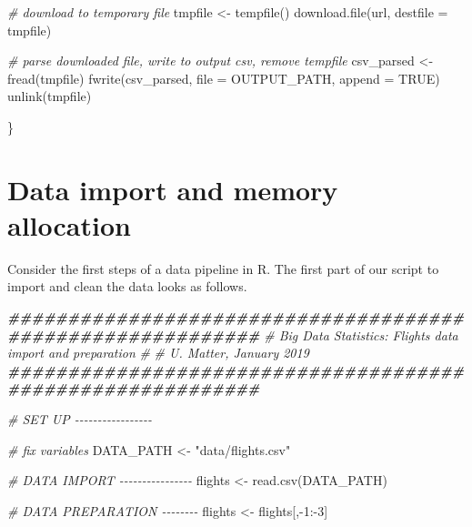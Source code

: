 \documentclass[
  12pt,
]{style/krantz}
\newenvironment{Shaded}{\begin{snugshade}}{\end{snugshade}}
\newcommand{\AttributeTok}[1]{\textcolor[rgb]{0.77,0.63,0.00}{#1}}
\newcommand{\CommentTok}[1]{\textcolor[rgb]{0.56,0.35,0.01}{\textit{#1}}}
\newcommand{\ConstantTok}[1]{\textcolor[rgb]{0.00,0.00,0.00}{#1}}
\newcommand{\DecValTok}[1]{\textcolor[rgb]{0.00,0.00,0.81}{#1}}
\newcommand{\DocumentationTok}[1]{\textcolor[rgb]{0.56,0.35,0.01}{\textbf{\textit{#1}}}}
\newcommand{\FunctionTok}[1]{\textcolor[rgb]{0.00,0.00,0.00}{#1}}
\newcommand{\NormalTok}[1]{#1}
\newcommand{\OtherTok}[1]{\textcolor[rgb]{0.56,0.35,0.01}{#1}}
\newcommand{\SpecialCharTok}[1]{\textcolor[rgb]{0.00,0.00,0.00}{#1}}
\newcommand{\StringTok}[1]{\textcolor[rgb]{0.31,0.60,0.02}{#1}}
\begin{document}
\begin{Shaded}
\begin{Highlighting}[]
     \CommentTok{\# download to temporary file}
\NormalTok{     tmpfile }\OtherTok{\textless{}{-}} \FunctionTok{tempfile}\NormalTok{()}
     \FunctionTok{download.file}\NormalTok{(url, }\AttributeTok{destfile =}\NormalTok{ tmpfile)}
     
     \CommentTok{\# parse downloaded file, write to output csv, remove tempfile}
\NormalTok{     csv\_parsed }\OtherTok{\textless{}{-}} \FunctionTok{fread}\NormalTok{(tmpfile)}
     \FunctionTok{fwrite}\NormalTok{(csv\_parsed,}
            \AttributeTok{file =}\NormalTok{  OUTPUT\_PATH,}
            \AttributeTok{append =} \ConstantTok{TRUE}\NormalTok{)}
     \FunctionTok{unlink}\NormalTok{(tmpfile)}
     
\NormalTok{\}}
\end{Highlighting}
\end{Shaded}

\hypertarget{data-import-and-memory-allocation}{%
\section{Data import and memory allocation}\label{data-import-and-memory-allocation}}

Consider the first steps of a data pipeline in R. The first part of our script to import and clean the data looks as follows.

\begin{Shaded}
\begin{Highlighting}[]
\DocumentationTok{\#\#\#\#\#\#\#\#\#\#\#\#\#\#\#\#\#\#\#\#\#\#\#\#\#\#\#\#\#\#\#\#\#\#\#\#\#\#\#\#\#\#\#\#\#\#\#\#\#\#\#\#\#\#\#\#\#\#\#}
\CommentTok{\# Big Data Statistics: Flights data import and preparation}
\CommentTok{\#}
\CommentTok{\# U. Matter, January 2019}
\DocumentationTok{\#\#\#\#\#\#\#\#\#\#\#\#\#\#\#\#\#\#\#\#\#\#\#\#\#\#\#\#\#\#\#\#\#\#\#\#\#\#\#\#\#\#\#\#\#\#\#\#\#\#\#\#\#\#\#\#\#\#\#}

\CommentTok{\# SET UP {-}{-}{-}{-}{-}{-}{-}{-}{-}{-}{-}{-}{-}{-}{-}{-}{-}}

\CommentTok{\# fix variables}
\NormalTok{DATA\_PATH }\OtherTok{\textless{}{-}} \StringTok{"data/flights.csv"}

\CommentTok{\# DATA IMPORT {-}{-}{-}{-}{-}{-}{-}{-}{-}{-}{-}{-}{-}{-}{-}{-}}
\NormalTok{flights }\OtherTok{\textless{}{-}} \FunctionTok{read.csv}\NormalTok{(DATA\_PATH)}

\CommentTok{\# DATA PREPARATION {-}{-}{-}{-}{-}{-}{-}{-}}
\NormalTok{flights }\OtherTok{\textless{}{-}}\NormalTok{ flights[,}\SpecialCharTok{{-}}\DecValTok{1}\SpecialCharTok{:{-}}\DecValTok{3}\NormalTok{]}
\end{Highlighting}
\end{Shaded}
\end{document}

